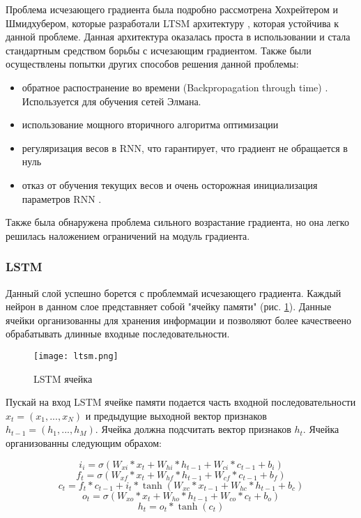 Проблема исчезающего градиента была подробно рассмотрена Хохрейтером и Шмидхубером, которые разработали LTSM архитектуру \cite{create_lstm}, которая устойчива к данной проблеме. Данная архитектура оказалась проста в использовании и стала стандартным средством борьбы с исчезающим градиентом. Также были осуществлены попытки других способов решения данной проблемы:
\begin{itemize}
	\item обратное распостранение во времени (Backpropagation through time) \cite{Backpropagation}. Используется для обучения сетей Элмана.
	\item использование мощного вторичного алгоритма оптимизации \cite{rnnlearning1}
	\item регуляризация весов в RNN, что гарантирует, что градиент не обращается в нуль \cite{rnnlearning2}
	\item отказ от обучения текущих весов и очень
	осторожная инициализация параметров RNN \cite{rnnlearning3}.
\end{itemize}
	
Также была обнаружена проблема сильного возрастание градиента, но она легко решилась наложением ограничений на модуль градиента.

\subsubsection{LSTM}

Данный слой успешно борется с проблеммай исчезающего градиента. Каждый нейрон в данном слое представняет собой "ячейку памяти" (рис. \ref{ris:ltsm}). Данные ячейки организованны для хранения информации и позволяют более качествеено обрабатывать длинные входные последовательности.

\begin{figure}[h]
\begin{center}
	\texttt{[image: ltsm.png]}
	\caption{LSTM ячейка}
	\label{ris:ltsm}
\end{center}
\end{figure}


Пускай на вход LSTM ячейке памяти подается часть входной последовательности $x_t = (x_1, ..., x_N)$ и предыдущие выходной вектор признаков $h_{t-1} = (h_1, ..., h_M)$. Ячейка должна подсчитать вектор признаков $h_t$. Ячейка организованны следующим обрахом:


\begin{equation}
	i_i = \sigma(W_{xi}*x_t+W_{hi}*h_{t-1}+W_{ci}*c_{t-1}+b_i)
\end{equation}
\begin{equation}
	f_t = \sigma(W_{xf}*x_t+W_{hf}*h_{t-1}+W_{cf}*c_{t-1}+b_f)
\end{equation}
\begin{equation}
	c_t = f_t*c_{t-1}+i_t*\tanh(W_{xc}*x_{t-1}+W_{hc}*h_{t-1}+b_c)
\end{equation}
\begin{equation}
	o_t = \sigma(W_{xo}*x_t+W_{ho}*h_{t-1}+W_{co}*c_t+b_o)
\end{equation}
\begin{equation}
	h_t = o_t*\tanh(c_t)
\end{equation}

